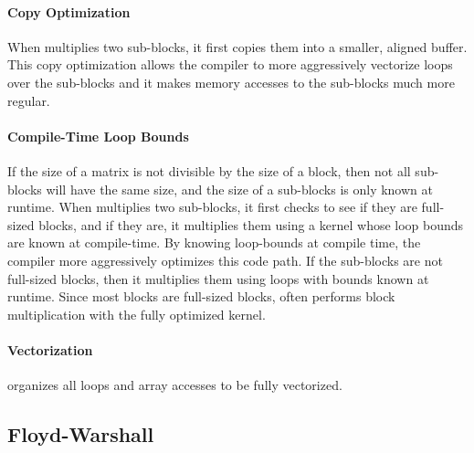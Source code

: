 \paragraph{Copy Optimization}
When \block{} multiplies two sub-blocks, it first copies them into a smaller,
aligned buffer. This copy optimization allows the compiler to more aggressively
vectorize loops over the sub-blocks and it makes memory accesses to the
sub-blocks much more regular.

\paragraph{Compile-Time Loop Bounds}
If the size of a matrix is not divisible by the size of a block, then not all
sub-blocks will have the same size, and the size of a sub-blocks is only known
at runtime. When \block{} multiplies two sub-blocks, it first checks to see if
they are full-sized blocks, and if they are, it multiplies them using a kernel
whose loop bounds are known at compile-time. By knowing loop-bounds at compile
time, the compiler more aggressively optimizes this code path.  If the
sub-blocks are not full-sized blocks, then it multiplies them using loops with
bounds known at runtime. Since most blocks are full-sized blocks, \block{}
often performs block multiplication with the fully optimized kernel.

\paragraph{Vectorization}
\block{} organizes all loops and array accesses to be fully vectorized.

\subsection{Floyd-Warshall}
